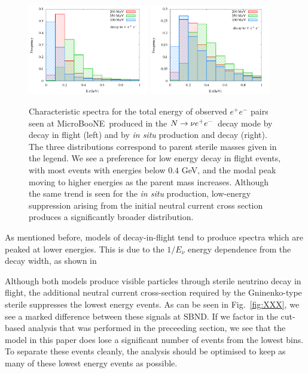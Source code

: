 \documentclass[11pt, a4paper]{article}
\newcommand{\reffig}[1]{Fig.~\ref{#1}}
\def\muboone{MicroBooNE}
\def\ster{\ensuremath N}
\begin{document}
\begin{figure}[t]
%
\center
%
\includegraphics[width=0.47\textwidth]{figures/spectrum_ee.png} \includegraphics[width=0.47\textwidth]{figures/spectrum_ee_situ.png}
%
\caption{\label{fig:spectrum_ee} Characteristic spectra for the total energy of observed  $e^+e^-$ pairs seen at \muboone\ produced in the $\ster \to \nu e^+e^-$ decay mode by decay in flight (left) and by \emph{in situ} production and decay (right). The three distributions correspond to parent sterile masses given in the legend. We see a preference for low energy decay in flight events, with most events with energies below $0.4$ GeV, and the modal peak moving to higher energies as the parent mass increases. Although the same trend is seen for the \emph{in situ} production, low-energy suppression arising from the initial neutral current cross section produces a significantly broader distribution.}
%
\end{figure}



As mentioned before, models of decay-in-flight tend to produce spectra which
are peaked at lower energies. This is due to the $1/E_\nu$ energy dependence
from the decay width, as shown in 

Although both models produce visible particles through sterile neutrino decay
in flight, the additional neutral current cross-section required by the
Gninenko-type sterile suppresses the lowest energy events. As can be seen in
\reffig{fig:XXX}, we see a marked difference between these signals at SBND. If
we factor in the cut-based analysis that was performed in the preceeding
section, we see that the model in this paper does lose a significant number of
events from the lowest bins. To separate these events cleanly, the analysis
should be optimised to keep as many of these lowest energy events as possible. 
\end{document}
